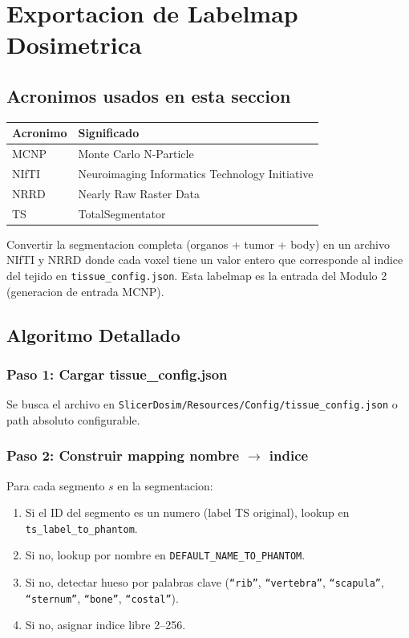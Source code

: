 \documentclass[12pt,a4paper]{article}
\begin{document}
\section{Exportacion de Labelmap Dosimetrica}
\label{sec:labelmap}

\subsection*{Acronimos usados en esta seccion}
\begin{tabular}{ll}
\toprule
\textbf{Acronimo} & \textbf{Significado} \\
\midrule
MCNP & Monte Carlo N-Particle \\
NIfTI & Neuroimaging Informatics Technology Initiative \\
NRRD & Nearly Raw Raster Data \\
TS & TotalSegmentator \\
\bottomrule
\end{tabular}

Convertir la segmentacion completa (organos + tumor + body) en un archivo NIfTI y NRRD donde
cada voxel tiene un valor entero que corresponde al indice del tejido en
\texttt{tissue\_config.json}. Esta labelmap es la entrada del Modulo 2 (generacion de entrada
MCNP).

\subsection{Algoritmo Detallado}

\subsubsection{Paso 1: Cargar tissue\_config.json}

Se busca el archivo en \texttt{SlicerDosim/Resources/Config/tissue\_config.json}
o path absoluto configurable.

\subsubsection{Paso 2: Construir mapping nombre \texorpdfstring{$\to$}{a} indice}

Para cada segmento $s$ en la segmentacion:

\begin{enumerate}
    \item Si el ID del segmento es un numero (label TS original), lookup en
          \texttt{ts\_label\_to\_phantom}.
    \item Si no, lookup por nombre en \texttt{DEFAULT\_NAME\_TO\_PHANTOM}.
    \item Si no, detectar hueso por palabras clave (\texttt{``rib''}, \texttt{``vertebra''},
          \texttt{``scapula''}, \texttt{``sternum''}, \texttt{``bone''}, \texttt{``costal''}).
    \item Si no, asignar indice libre 2--256.
\end{enumerate}
\end{document}
